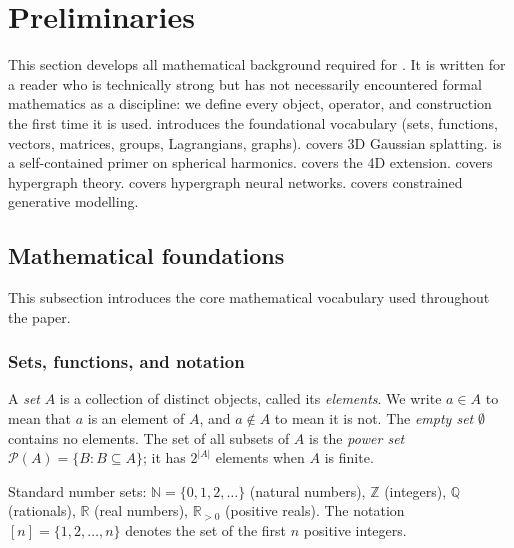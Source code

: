 \documentclass[11pt,a4paper]{article}
\theoremstyle{plain}
\theoremstyle{definition}
\theoremstyle{remark}
\begin{document}
\section{Preliminaries}
\label{sec:prelim}

This section develops all mathematical background required for
. It is
written for a reader who is technically strong but has not necessarily
encountered formal mathematics as a discipline: we define every object,
operator, and construction the first time it is used. 
introduces the foundational vocabulary (sets, functions, vectors,
matrices, groups, Lagrangians, graphs).  covers
3D Gaussian splatting.  is a self-contained primer
on spherical harmonics.  covers the 4D extension.
 covers hypergraph theory.
 covers hypergraph neural networks.
 covers constrained generative modelling.

\subsection{Mathematical foundations}
\label{sec:prelim_foundations}

This subsection introduces the core mathematical vocabulary used
throughout the paper.

\subsubsection{Sets, functions, and notation}

A \emph{set} $A$ is a collection of distinct objects, called its
\emph{elements}. We write $a \in A$ to mean that $a$ is an element of
$A$, and $a \notin A$ to mean it is not. The \emph{empty set}
$\emptyset$ contains no elements. The set of all subsets of $A$ is
the \emph{power set} $\mathcal{P}(A) = \{B : B \subseteq A\}$; it
has $2^{|A|}$ elements when $A$ is finite.

Standard number sets: $\mathbb{N} = \{0,1,2,\ldots\}$ (natural
numbers), $\mathbb{Z}$ (integers), $\mathbb{Q}$ (rationals),
$\mathbb{R}$ (real numbers), $\mathbb{R}_{>0}$ (positive reals).
The notation $[n] = \{1, 2, \ldots, n\}$ denotes the set of the first
$n$ positive integers.
\end{document}
